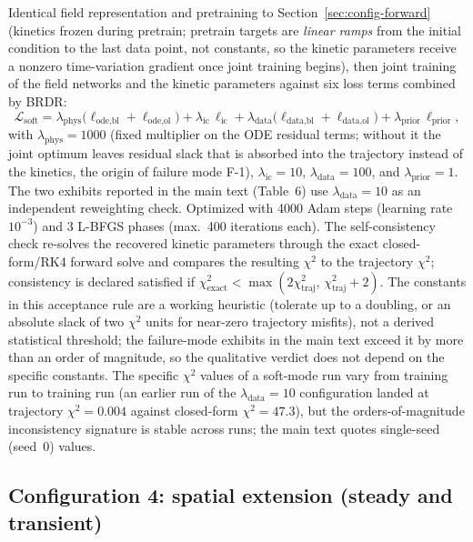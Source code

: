 Identical field representation and pretraining to
Section~\ref{sec:config-forward} (kinetics frozen during pretrain;
pretrain targets are \emph{linear ramps} from the initial condition to
the last data point, not constants, so the kinetic parameters receive a
nonzero time-variation gradient once joint training begins), then joint
training of the field networks and the kinetic parameters against six
loss terms combined by BRDR:
\begin{equation}
\mathcal{L}_\text{soft} =
\lambda_\text{phys}\big(\ell_\text{ode,bl} + \ell_\text{ode,ol}\big)
+ \lambda_\text{ic}\,\ell_\text{ic}
+ \lambda_\text{data}\big(\ell_\text{data,bl} + \ell_\text{data,ol}\big)
+ \lambda_\text{prior}\,\ell_\text{prior},
\label{eq:softloss}
\end{equation}
with $\lambda_\text{phys} = 1000$ (fixed multiplier on the ODE
residual terms; without it the joint optimum leaves residual slack
that is absorbed into the trajectory instead of the kinetics, the origin of failure mode F-1), $\lambda_\text{ic} = 10$,
$\lambda_\text{data} = 100$, and $\lambda_\text{prior} = 1$. The two
exhibits reported in the main text (Table~6) use
$\lambda_\text{data}=10$ as an independent reweighting check. Optimized
with 4000 Adam steps (learning rate $10^{-3}$) and 3 L-BFGS phases
(max.\ 400 iterations each). The self-consistency check re-solves the
recovered kinetic parameters through the exact closed-form/RK4 forward
solve and compares the resulting $\chi^2$ to the trajectory $\chi^2$;
consistency is declared satisfied if
$\chi^2_\text{exact} < \max(2\chi^2_\text{traj},\, \chi^2_\text{traj}+2)$.
The constants in this acceptance rule are a working heuristic (tolerate
up to a doubling, or an absolute slack of two $\chi^2$ units for
near-zero trajectory misfits), not a derived statistical threshold; the
failure-mode exhibits in the main text exceed it by more than an order
of magnitude, so the qualitative verdict does not depend on the
specific constants. The specific $\chi^2$ values of a soft-mode run
vary from training run to training run (an earlier run of the
$\lambda_\text{data}=10$ configuration landed at trajectory
$\chi^2 = 0.004$ against closed-form $\chi^2 = 47.3$), but the
orders-of-magnitude inconsistency signature is stable across runs; the
main text quotes single-seed (seed~0) values.

\subsection{Configuration 4: spatial extension (steady and transient)}
\label{sec:config-spatial}

